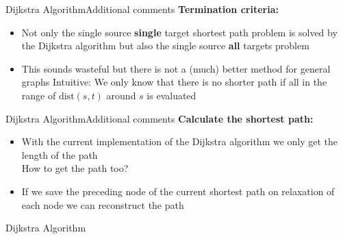 
\begin{frame}{Dijkstra Algorithm}{Additional comments}
  \textbf{Termination criteria:}
  \begin{itemize}
    \item
      Not only the {\color{Mittel-Blau}single source \textbf{single} target}
      shortest path problem is solved by the Dijkstra algorithm but also the
      {\color{Mittel-Blau}single source \textbf{all} targets} problem
    \item
      This sounds wasteful but there is not a (much) better method for general
      graphs
      {\color{gray}Intuitive:} We only know that there is no shorter path if
      all in the range of {\color{Mittel-Blau}$\mathrm{dist}(s, t)$} around
      {\color{Mittel-Blau}$s$} is evaluated
  \end{itemize}
\end{frame}


\begin{frame}{Dijkstra Algorithm}{Additional comments}
  \textbf{Calculate the shortest path:}
  \begin{itemize}
    \item
      With the current implementation of the Dijkstra algorithm we only get
      the {\color{Mittel-Blau}length} of the path\\
      {\color{gray}How to get the path too?}
    \item
      If we save the preceding node of the current shortest path on
      {\color{Mittel-Blau}relaxation} of each node we can reconstruct the
      {\color{Mittel-Blau}path}
  \end{itemize}
\end{frame}


\begin{frame}{Dijkstra Algorithm}
  \vspace{-1em}
  \begin{figure}[!h]
    \begin{adjustbox}{width=\linewidth}
      \def\DijkstraReverse{1}%
      
    \end{adjustbox}
    \vspace{-2em}
    \caption{%
    }
  \end{figure}
\end{frame}

